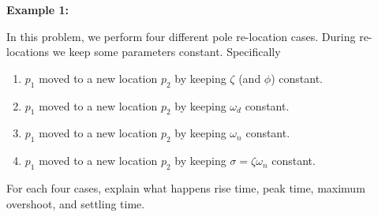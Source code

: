 \documentclass[twoside]{article}
\begin{document}

\textbf{Example 1:} 

In this problem, we perform four different pole
re-location cases. During re-locations we keep some parameters
constant. Specifically
%
\begin{enumerate}
\item $p_1$ moved to a new location $p_2$ by keeping $\zeta$ (and
  $\phi$) constant.
\item $p_1$ moved to a new location $p_2$ by keeping $\omega_d$
  constant.
\item $p_1$ moved to a new location $p_2$ by keeping $\omega_n$
  constant.
\item $p_1$ moved to a new location $p_2$ by keeping $\sigma = \zeta \omega_n$
  constant.
\end{enumerate}

For each four cases, explain what happens rise time, peak time,
maximum overshoot, and settling time.
\end{document}
